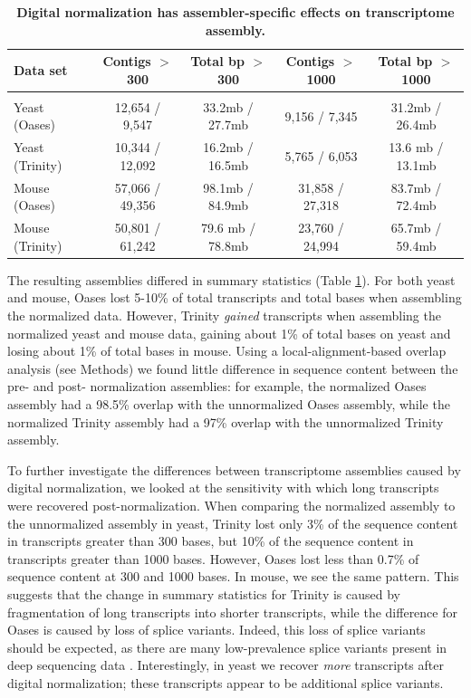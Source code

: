 \begin{table}[!ht]
\small
\caption{
\bf{Digital normalization has assembler-specific effects on transcriptome
assembly.}}


\begin{tabular}{|l|c|c|c|c|}

Data set & Contigs $>$ 300 & Total bp $>$ 300 & Contigs $>$ 1000 & Total bp $>$ 1000 \\
\hline \\
Yeast (Oases) & 12,654 / 9,547 & 33.2mb / 27.7mb & 9,156 / 7,345 & 31.2mb / 26.4mb \\
Yeast (Trinity) & 10,344 / 12,092 & 16.2mb / 16.5mb & 5,765 / 6,053 & 13.6 mb / 13.1mb \\
Mouse (Oases) & 57,066 / 49,356 & 98.1mb / 84.9mb & 31,858 / 27,318 & 83.7mb / 72.4mb \\
Mouse (Trinity) & 50,801 / 61,242 & 79.6 mb / 78.8mb & 23,760 / 24,994 & 65.7mb / 59.4mb \\

\end{tabular}

\begin{flushleft}
\end{flushleft}
\label{tab:dntrans0}
\end{table}


The resulting assemblies differed in summary statistics (Table
\ref{tab:dntrans0}).  For both yeast and mouse, Oases lost 5-10\% of total
transcripts and total bases when assembling the normalized data.  However,
Trinity {\em gained} transcripts when assembling the normalized yeast and mouse
data, gaining about 1\% of total bases on yeast and losing about 1\% of total
bases in mouse.  Using a local-alignment-based overlap analysis (see Methods)
we found little difference in sequence content between the pre- and post-
normalization assemblies: for example, the normalized Oases assembly had a
98.5\% overlap with the unnormalized Oases assembly, while the normalized
Trinity assembly had a 97\% overlap with the unnormalized Trinity assembly.

To further investigate the differences between transcriptome assemblies caused
by digital normalization, we looked at the sensitivity with which long
transcripts were recovered post-normalization.  When comparing the normalized
assembly to the unnormalized assembly in yeast, Trinity lost only 3\% of the
sequence content in transcripts greater than 300 bases, but 10\% of the
sequence content in transcripts greater than 1000 bases.  However, Oases lost
less than 0.7\% of sequence content at 300 and 1000 bases.  In mouse, we see
the same pattern. This suggests that the change in summary statistics for
Trinity is caused by fragmentation of long transcripts into shorter
transcripts, while the difference for Oases is caused by loss of splice
variants.  Indeed, this loss of splice variants should be expected, as there
are many low-prevalence splice variants present in deep sequencing data
\cite{pubmed21151575}. Interestingly, in yeast we recover {\em more}
transcripts after digital normalization; these transcripts appear to be
additional splice variants.

